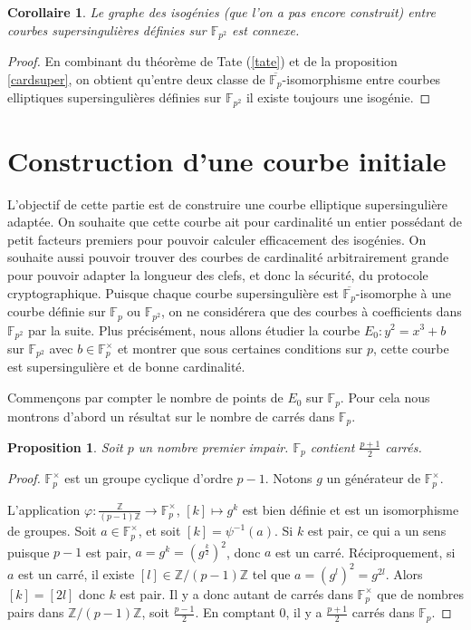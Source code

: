\documentclass{article}
\theoremstyle{plain}%
\newtheorem{prop}[thm]{Proposition}
\newtheorem{cor}[thm]{Corollaire}
\theoremstyle{definition}%
\newcommand{\F}{\mathbb{F}}
\newcommand{\Z}{\mathbb{Z}}
\begin{document}
\begin{cor}
  Le graphe des isogénies (que l'on a pas encore construit) entre courbes supersingulières définies sur $\F_{p^2}$ est connexe.
\end{cor}

\begin{proof}
  En combinant du théorème de Tate (\ref{tate}) et de la proposition \ref{cardsuper}, on obtient qu'entre deux classe de $\overline{\F_p}$-isomorphisme entre courbes elliptiques supersingulières définies sur $\F_{p^2}$ il existe toujours une isogénie.
\end{proof}

\section{Construction d'une courbe initiale}

L'objectif de cette partie est de construire une courbe elliptique supersingulière adaptée. 
On souhaite que cette courbe ait pour cardinalité un entier possédant de petit facteurs premiers pour pouvoir calculer efficacement des isogénies. 
On souhaite aussi pouvoir trouver des courbes de cardinalité arbitrairement grande pour pouvoir adapter la longueur des clefs, et donc la sécurité, du protocole cryptographique.
Puisque chaque courbe supersingulière est $\overline{\F_p}$-isomorphe à une courbe définie sur $\F_{p}$ ou $\F_{p^2}$, on ne considérera que des courbes à coefficients dans $\F_{p^2}$ par la suite.
Plus précisément, nous allons étudier la courbe $E_0 : y^2 = x^3 + b$ sur $\F_{p^2}$ avec $b\in\F_{p}^\times$ et montrer que sous certaines conditions sur $p$, cette courbe est supersingulière et de bonne cardinalité.


Commençons par compter le nombre de points de $E_0$ sur $\F_{p}$. Pour cela nous montrons d'abord un résultat sur le nombre de carrés dans $\F_{p}$.

\begin{prop}
  Soit $p$ un nombre premier impair. $\F_{p}$ contient $\frac{p+1}{2}$ carrés.
\end{prop}

\begin{proof}
  $\F_{p}^\times$ est un groupe cyclique d'ordre $p-1$. 
  Notons $g$ un générateur de $\F_{p}^\times$. 
  
  L'application $ \varphi \colon \frac{\Z}{(p-1)\Z} \to \F_{p}^\times$,
  $[k] \mapsto g^k$
  est bien définie et est un isomorphisme de groupes.
  Soit $a\in \F_{p}^\times$, et soit $[k] = \psi^{-1}(a)$.
  Si $k$ est pair, ce qui a un sens puisque $p-1$ est pair, $a = g^k = (g^\frac{k}{2})^2$, donc $a$ est un carré.
  Réciproquement, si $a$ est un carré, il existe $[l]\in \Z/(p-1)\Z$ tel que $a = (g^l)^2 = g^{2l}$.
  Alors $[k] = [2l]$ donc $k$ est pair.
  Il y a donc autant de carrés dans $\F_{p}^\times$ que de nombres pairs dans $\Z/{(p-1)\Z}$, soit $\frac{p-1}{2}$. 
  En comptant $0$, il y a $\frac{p+1}{2}$ carrés dans $\F_{p}$. 
\end{proof}
\end{document}
